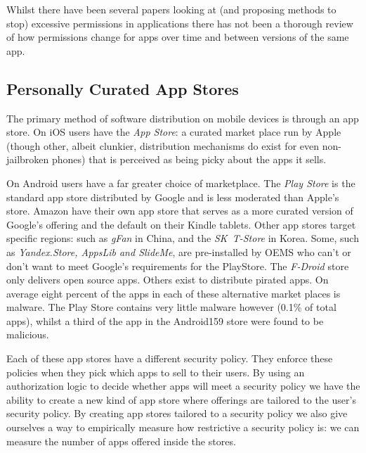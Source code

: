 \documentclass[report.tex]{subfiles}
\begin{document}
Whilst there have been several papers looking at (and proposing methods to stop)
excessive permissions in applications\cite{Felt:2011kj}\cite{Vidas:2011wr} there
has not been a thorough review of how permissions change for apps over time
and between versions of the same app. 



\subsection{Personally Curated App Stores}

The primary method of software distribution on mobile devices is through an app
store.  On iOS users have the \emph{App Store}: a curated market place run by
Apple (though other, albeit clunkier, distribution mechanisms do exist for even
non-jailbroken phones) that is perceived as being picky about the apps it sells.

On Android users have a far greater choice of marketplace.  The \emph{Play
  Store} is the standard app store distributed by Google and is less moderated
than Apple's store.  Amazon have their own app store that serves as a more
curated version of Google's offering and the default on their Kindle tablets.
Other app stores target specific regions: such as \emph{gFan} in China, and the
\emph{SK~T-Store} in Korea.  Some, such as \emph{Yandex.Store, AppsLib and
  SlideMe}, are pre-installed by OEMS who can't or don't want to meet Google's
requirements for the PlayStore.  The \emph{F-Droid} store only delivers open
source apps. Others exist to distribute pirated apps.  On average eight
percent\cite{AQUILINO:2013wr} of the apps in each of these alternative market
places is malware. The Play Store contains very little malware however (0.1\% of
total apps), whilst a third of the app in the Android159 store were found to be
malicious.

Each of these app stores have a different security policy.  They enforce these
policies when they pick which apps to sell to their users.  By using an
authorization logic to decide whether apps will meet a security policy we have
the ability to create a new kind of app store where offerings are tailored to
the user's security policy.  By creating app stores tailored to a security
policy we also give ourselves a way to empirically measure how restrictive a
security policy is: we can measure the number of apps offered inside the stores.
\end{document}
